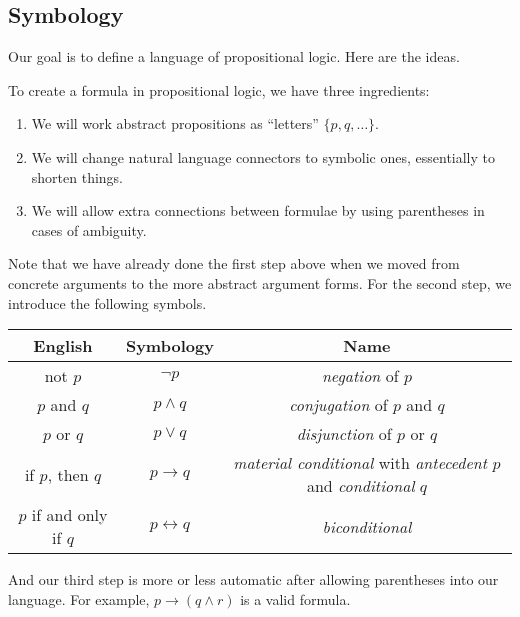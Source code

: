 \documentclass[../notes.tex]{subfiles}
\begin{document}
\subsection{Symbology}
Our goal is to define a language of propositional logic. Here are the ideas.
\begin{idea}
	To create a formula in propositional logic, we have three ingredients:
	\begin{enumerate}
		\item We will work abstract propositions as ``letters'' $\{p,q,\ldots\}$.
		\item We will change natural language connectors to symbolic ones, essentially to shorten things.
		\item We will allow extra connections between formulae by using parentheses in cases of ambiguity.
	\end{enumerate}
\end{idea}
Note that we have already done the first step above when we moved from concrete arguments to the more abstract argument forms. For the second step, we introduce the following symbols.
\begin{center}
	\begin{tabular}{c|c|c}
		English & Symbology & Name \\\hline
		not $p$ & $\lnot p$ & \textit{negation} of $p$ \\
		$p$ and $q$ & $p\land q$ & \textit{conjugation} of $p$ and $q$ \\
		$p$ or $q$ & $p\lor q$ & \textit{disjunction} of $p$ or $q$ \\
		if $p$, then $q$ & $p\to q$ & \textit{material conditional} with \textit{antecedent} $p$ and \textit{conditional} $q$ \\
		$p$ if and only if $q$ & $p\leftrightarrow q$ & \textit{biconditional}
	\end{tabular}
\end{center}
And our third step is more or less automatic after allowing parentheses into our language. For example, $p\to(q\land r)$ is a valid formula.
\end{document}
